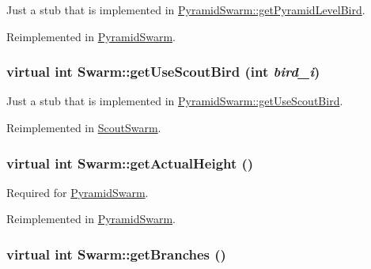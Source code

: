 Just a stub that is implemented in \hyperlink{classPyramidSwarm_756af67d13a153ab3d2581673733b474}{PyramidSwarm::getPyramidLevelBird}. 



Reimplemented in \hyperlink{classPyramidSwarm_c88d70f33dee3ffa27d63e2877c8a8ad}{PyramidSwarm}.\hypertarget{classSwarm_dc807f39f42c11f5ba10c0a82f1e6f4e}{
\subsubsection{\setlength{\rightskip}{0pt plus 5cm}virtual int Swarm::getUseScoutBird (int {\em bird\_\-i})}}
\label{classSwarm_dc807f39f42c11f5ba10c0a82f1e6f4e}


Just a stub that is implemented in \hyperlink{classSwarm_dc807f39f42c11f5ba10c0a82f1e6f4e}{PyramidSwarm::getUseScoutBird}. 



Reimplemented in \hyperlink{classScoutSwarm_9a2a45ebe72cf9302d5d30270efbca1d}{ScoutSwarm}.\hypertarget{classSwarm_73a690fe6e3d6550098dc8ffc2f977c2}{
\subsubsection{\setlength{\rightskip}{0pt plus 5cm}virtual int Swarm::getActualHeight ()}}
\label{classSwarm_73a690fe6e3d6550098dc8ffc2f977c2}


Required for \hyperlink{classPyramidSwarm}{PyramidSwarm}. 



Reimplemented in \hyperlink{classPyramidSwarm_651f505aa4513559e87f2481ea259443}{PyramidSwarm}.\hypertarget{classSwarm_c248592977868472b6874016ad273dbb}{
\subsubsection{\setlength{\rightskip}{0pt plus 5cm}virtual int Swarm::getBranches ()}}
\label{classSwarm_c248592977868472b6874016ad273dbb}


